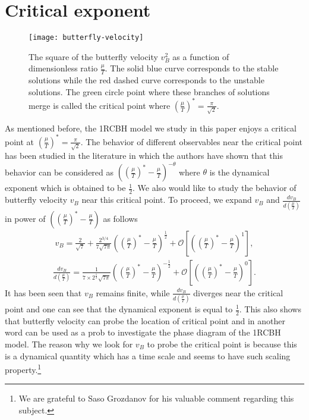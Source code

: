 \documentclass[preprintnumbers,aps,prd,longbibliography,nofootinbib,nobibnotes,amsmath,amssymb]{revtex4}
\begin{document}
\section{Critical exponent}\label{sec3}
\begin{figure}
\centering
\texttt{[image: butterfly-velocity]}
\caption{The square of the butterfly velocity $v_B^2$ as a function of dimensionless ratio $\frac{\mu}{T}$. The solid blue curve corresponds to the stable solutions while the red dashed curve corresponds to the unstable solutions. The green circle point where these branches of solutions merge is called the critical point where $(\frac{\mu}{T})^*=\frac{\pi}{\sqrt{2}}$. }
\label{VB}
\end{figure}
As mentioned before, the 1RCBH model we study in this paper enjoys a critical point at $(\frac{\mu}{T})^*=\frac{\pi}{\sqrt{2}}$. The behavior of different observables near the critical point has been studied in the literature \cite{DeWolfe:2011ts,Ebrahim:2018uky,Ebrahim:2020qif,Amrahi:2020jqg,Amrahi:2021lgh,Finazzo:2016psx,Ebrahim:2017gvk,Asadi:2021hds} in which the authors  have shown that this behavior can be considered as $\left((\frac{\mu}{T})^*-\frac{\mu}{T}\right)^{-\theta}$ where $\theta$ is the dynamical exponent which is obtained to be $\frac{1}{2}$. We also would like to  study the behavior of butterfly velocity $v_B$ near this critical point. To proceed, we expand $v_B$ and  $\frac{dv_B}{d\left(\frac{\mu}{T}\right)}$ in power of $\left((\frac{\mu}{T})^*-\frac{\mu}{T}\right)$ as follows
 \begin{align}
v_B=\frac{2}{\sqrt{7}}+\frac{2^{3/4}}{7\sqrt{7\pi}}\left((\frac{\mu}{T})^*-\frac{\mu}{T}\right)^{\frac{1}{2}}+\mathcal{O}\left[\left((\frac{\mu}{T})^*-\frac{\mu}{T}\right)^1\right],
 \end{align}
 \begin{align}
\frac{dv_B}{d\left(\frac{\mu}{T}\right)}=\frac{1}{7\times 2^\frac{1}{4}\sqrt{7\pi}}\left((\frac{\mu}{T})^*-\frac{\mu}{T}\right)^{-\frac{1}{2}}+\mathcal{O}\left[\left((\frac{\mu}{T})^*-\frac{\mu}{T}\right)^0\right].
 \end{align}
It has been  seen that  $v_B$ remains finite, while $\frac{dv_B}{d\left(\frac{\mu}{T}\right)}$ diverges near the critical point and  one can see that the dynamical exponent is equal to $\frac{1}{2}$. This also shows that butterfly velocity can probe the location of critical point and in another word can be used as a prob to investigate the phase diagram of the 1RCBH model. The reason why we look for  $v_B$ to probe the critical point is because this is a dynamical quantity which has a time scale and seems to have such scaling property.\footnote{We are grateful to Saso Grozdanov for his valuable comment regarding this subject.}
\end{document}
